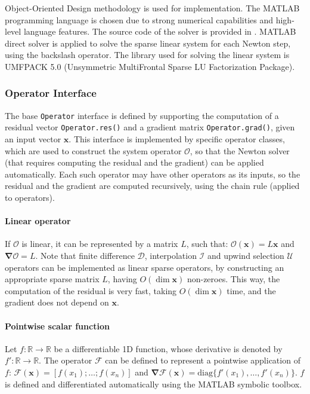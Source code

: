 \documentclass[preprint,10pt]{elsarticle}
\newcommand{\diag}{\ensuremath{\mathrm{diag}}}
\newcommand{\RR}{\ensuremath{\mathbb{R}}}
\newcommand\bnabla{\boldsymbol{\nabla}}
\newcommand\bx{\boldsymbol{x}}
\newcommand\cF{\mathcal{F}}
\newcommand\cO{\mathcal{O}}
\newcommand\cI{\mathcal{I}}
\newcommand\cD{\mathcal{D}}
\begin{document}
Object-Oriented Design methodology is used for implementation.
The MATLAB programming language is chosen due to strong numerical capabilities
and high-level language features.
The source code of the solver is provided in \cite{source}.
MATLAB direct solver is applied to solve the sparse linear system for each Newton step,
using the backslash operator. 
The library used for solving the linear system is UMFPACK 5.0 \cite{davis2004umfpack}
(Unsymmetric MultiFrontal Sparse LU Factorization Package).

\subsubsection{Operator Interface} \label{sec:operator-interface}
The base \verb|Operator| interface is defined by 
supporting the computation of a residual vector \verb|Operator.res()|
and a gradient matrix \verb|Operator.grad()|, given an input vector $\bx$.
This interface is implemented by specific operator classes,
which are used to construct the system operator $\cO$, so that 
the Newton solver (that requires computing the residual and the gradient) 
can be applied automatically.
Each such operator may have other operators as its inputs, so the residual
and the gradient are computed recursively, using the chain rule (applied to operators).

\paragraph{Linear operator}
If $\cO$ is linear, it can be represented by a matrix $L$, such that:
$\cO(\bx) = L \bx$ and $\bnabla\cO = L$.
Note that finite difference $\cD$, interpolation $\cI$ and 
upwind selection $\mathcal{U}$ operators
can be implemented as linear sparse operators, by constructing 
an appropriate sparse matrix $L$, having $O(\dim \bx)$ non-zeroes.
This way, the computation of the residual is very fast, taking $O(\dim \bx)$ time,
and the gradient does not depend on $\bx$.

\paragraph{Pointwise scalar function}
Let $f: \RR \rightarrow \RR$ be a differentiable 1D function, whose derivative is
denoted by $f': \RR \rightarrow \RR$. The operator $\cF$ can be defined to
represent a pointwise application of $f$:
$\cF(\bx) = [f(x_1); \ldots; f(x_n)]$ and $\bnabla\cF(\bx) = \diag\{f'(x_1), \ldots, f'(x_n)\}$.
$f$ is defined and differentiated automatically using the MATLAB symbolic toolbox.
\end{document}
